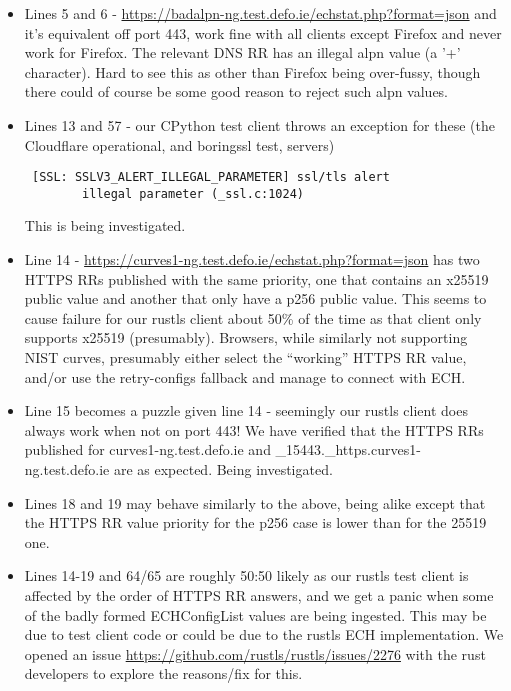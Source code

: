 \begin{itemize}

    \item Lines 5 and 6 -
        \url{https://badalpn-ng.test.defo.ie/echstat.php?format=json} and it's
        equivalent off port 443, work fine with all clients except Firefox and
        never work for Firefox. The relevant DNS RR has an illegal alpn value
        (a '+' character). Hard to see this as other than Firefox being
        over-fussy, though there could of course be some good reason to reject
        such alpn values.

    \item Lines 13 and 57 - our CPython test client throws an exception for
        these (the Cloudflare operational, and boringssl test, servers)
        \begin{verbatim} [SSL: SSLV3_ALERT_ILLEGAL_PARAMETER] ssl/tls alert
        illegal parameter (_ssl.c:1024) \end{verbatim} This is being
        investigated.

    \item Line 14 -
        \url{https://curves1-ng.test.defo.ie/echstat.php?format=json} has two
        HTTPS RRs published with the same priority, one that contains an x25519
        public value and another that only have a p256 public value. This seems
        to cause failure for our rustls client about 50\% of the time as that
        client only supports x25519 (presumably). Browsers, while similarly not
        supporting NIST curves, presumably either select the ``working'' HTTPS
        RR value, and/or use the retry-configs fallback and manage to connect
        with ECH.

    \item Line 15 becomes a puzzle given line 14 - seemingly our rustls client
        does always work when not on port 443! We have verified that the HTTPS
        RRs published for curves1-ng.test.defo.ie and
        \_15443.\_https.curves1-ng.test.defo.ie are as expected. Being
        investigated.

    \item Lines 18 and 19 may behave similarly to the above, being alike except
        that the HTTPS RR value priority for the p256 case is lower than for
        the 25519 one.

    \item Lines 14-19 and 64/65 are roughly 50:50 likely as our rustls test
        client is affected by the order of HTTPS RR answers, and we get a panic
        when some of the badly formed ECHConfigList values are being ingested.
        This may be due to test client code or could be due to the rustls ECH
        implementation. We opened an issue
        \url{https://github.com/rustls/rustls/issues/2276} with the rust
        developers to explore the reasons/fix for this.


\end{itemize}
